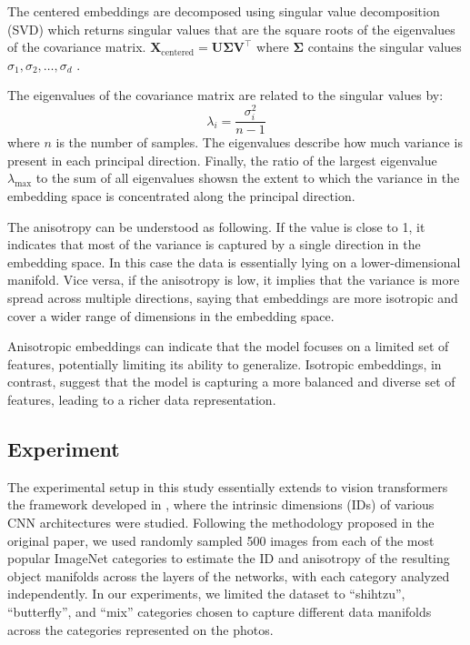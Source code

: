 \documentclass[
  11pt,
  a4paper,
  onecolumn]{article}
\begin{document}
The centered embeddings are decomposed using singular value decomposition (SVD) which returns singular values that are the square roots of the eigenvalues of the covariance matrix.
$
\mathbf{X}_{\text{centered}} = \mathbf{U} \mathbf{\Sigma} \mathbf{V}^\top
$
where $\mathbf{\Sigma}$ contains the singular values $\sigma_1, \sigma_2, \ldots, \sigma_d$ .

The eigenvalues of the covariance matrix are related to the singular values by:
\[
\lambda_i = \frac{\sigma_i^2}{n - 1}
\]
where $n$ is the number of samples. The eigenvalues describe how much variance is present in each principal direction. Finally, the ratio of the largest eigenvalue $\lambda_{\text{max}}$ to the sum of all eigenvalues showsn the extent to which the variance in the embedding space is concentrated along the principal direction.

The anisotropy can be understood as following. If the value is close to 1, it indicates that most of the variance is captured by a single direction in the embedding space. In this case the data is essentially lying on a lower-dimensional manifold. Vice versa, if the anisotropy is low, it implies that the variance is more spread across multiple directions, saying that embeddings are more isotropic and cover a wider range of dimensions in the embedding space.

Anisotropic embeddings can indicate that the model focuses on a limited set of features, potentially limiting its ability to generalize. Isotropic embeddings, in contrast, suggest that the model is capturing a more balanced and diverse set of features, leading to a richer data representation.


\subsection{Experiment}

The experimental setup in this study  essentially extends to vision transformers the framework developed in \cite{ansuini2019intrinsic}, where the intrinsic dimensions (IDs) of various CNN architectures were studied. Following the methodology proposed in the original paper, we used randomly sampled 500 images from each of the most popular ImageNet categories to estimate the ID and anisotropy of the resulting object manifolds across the layers of the networks, with each category analyzed independently. In our experiments, we limited the dataset to “shihtzu”, “butterfly”, and “mix” categories chosen to capture different data manifolds across the categories represented on the photos.
\end{document}
